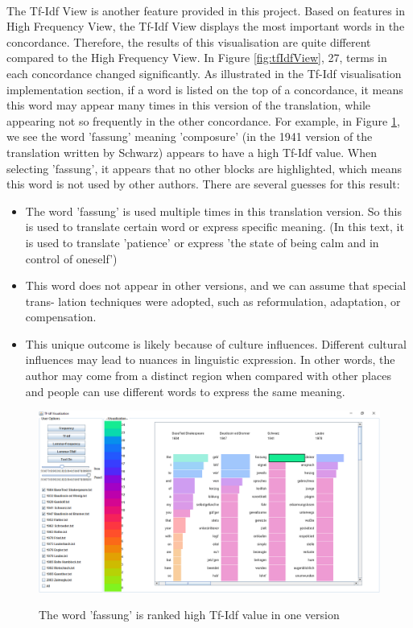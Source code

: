 \paragraph[]{}The Tf-Idf View is another feature provided in this project. Based on features in High Frequency View, the Tf-Idf View displays the most important words in the concordance. Therefore, the results of this visualisation are quite different compared to the High Frequency View. In Figure \ref{fig:tfIdfView}, 27, terms in each concordance changed significantly. As illustrated in the Tf-Idf visualisation implementation section, if a word is listed on the top of a concordance, it means this word may appear many times in this version of the translation, while appearing not so frequently in the other concordance. For example, in Figure \ref{fig:fassung}, we see the word 'fassung' meaning 'composure' (in the 1941 version of the translation written by Schwarz) appears to have a high Tf-Idf value. When selecting 'fassung', it appears that no other blocks are highlighted, which means this word is not used by other authors. There are several guesses for this result:
\begin{itemize} 	
	\item \textbf{} The word 'fassung' is used multiple times in this translation version. So this is used to translate certain word or express specific meaning. (In this text, it is used to translate 'patience' or express 'the state of being calm and in control of oneself')
	\item \textbf{} This word does not appear in other versions, and we can assume that special trans- lation techniques were adopted, such as reformulation, adaptation, or compensation. 
	\item \textbf{} This unique outcome is likely because of  culture influences. Different cultural influences may lead to nuances in linguistic expression. In other words, the author may come from a distinct region when compared with other places and people can use different words to express the same meaning.
\end{itemize} 

\begin{figure}[H]
	\centering	
	\includegraphics[width=\textwidth]{Figs/Fassung}\\[1ex]
	\caption{The word 'fassung' is ranked high Tf-Idf value in one version}
	\label{fig:fassung}
\end{figure} 

